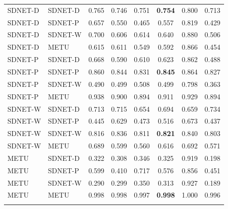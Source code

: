 \begin{table}[p]
\begin{tabular*}{\textwidth}{@{\extracolsep\fill}llcccccc@{}}
SDNET-D & SDNET-D & 0.765 & 0.746 & 0.751 & \textbf{0.754} & 0.800 & 0.713 \\
SDNET-D & SDNET-P & 0.657 & 0.550 & 0.465 & 0.557 & 0.819 & 0.429 \\
SDNET-D & SDNET-W & 0.700 & 0.606 & 0.614 & 0.640 & 0.880 & 0.506 \\
SDNET-D & METU & 0.615 & 0.611 & 0.549 & 0.592 & 0.866 & 0.454 \\
SDNET-P & SDNET-D & 0.668 & 0.590 & 0.610 & 0.623 & 0.862 & 0.488 \\
SDNET-P & SDNET-P & 0.860 & 0.844 & 0.831 & \textbf{0.845} & 0.864 & 0.827 \\
SDNET-P & SDNET-W & 0.490 & 0.499 & 0.508 & 0.499 & 0.798 & 0.363 \\
SDNET-P & METU & 0.938 & 0.900 & 0.894 & 0.911 & 0.929 & 0.894 \\
SDNET-W & SDNET-D & 0.713 & 0.715 & 0.654 & 0.694 & 0.659 & 0.734 \\
SDNET-W & SDNET-P & 0.445 & 0.629 & 0.473 & 0.516 & 0.673 & 0.437 \\
SDNET-W & SDNET-W & 0.816 & 0.836 & 0.811 & \textbf{0.821} & 0.840 & 0.803 \\
SDNET-W & METU & 0.689 & 0.599 & 0.560 & 0.616 & 0.692 & 0.571 \\
METU & SDNET-D & 0.322 & 0.308 & 0.346 & 0.325 & 0.919 & 0.198 \\
METU & SDNET-P & 0.599 & 0.410 & 0.717 & 0.576 & 0.856 & 0.451 \\
METU & SDNET-W & 0.290 & 0.299 & 0.350 & 0.313 & 0.927 & 0.189 \\
METU & METU & 0.998 & 0.998 & 0.997 & \textbf{0.998} & 1.000 & 0.996 \\
\botrule
\end{tabular*}
\end{table}

